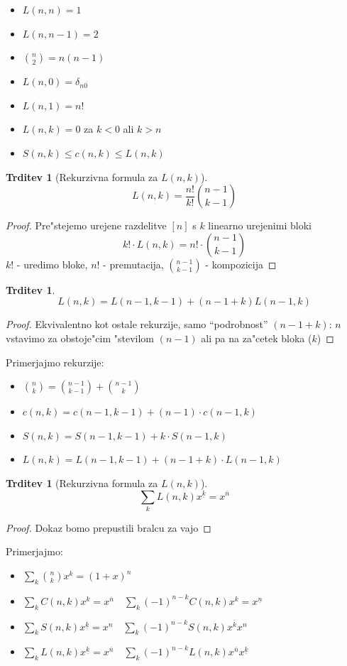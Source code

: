 \documentclass[a4paper,12pt]{article}
\theoremstyle{definition}
\newtheorem{claim}[counter]{Trditev}
\theoremstyle{remark}
\begin{document}
\begin{itemize}
	\item $L(n,n) = 1$
	\item $L(n,n-1) = 2$
	\item $\binom{n}{2} = n(n-1)$
	\item $L(n,0) = \delta_{n0}$
	\item $L(n,1) = n!$
	\item $L(n,k) = 0$ za $k < 0$ ali $k > n$
	\item $S(n,k) \leq c(n,k) \leq L(n,k)$
\end{itemize}

\begin{claim}[Rekurzivna formula za $L(n, k)$]
    \[L(n,k) = \frac{n!}{k!} \binom{n-1}{k-1}\]
\end{claim}
\begin{proof}
    Pre"stejemo urejene razdelitve $[n]$ s $k$ linearno urejenimi bloki
    \[ k! \cdot L(n,k) = n! \cdot \binom{n-1}{k-1} \]
    $k!$ - uredimo bloke, $n!$ - premutacija, $\binom{n-1}{k-1}$ - kompozicija
\end{proof}

\begin{claim}
    \[L(n,k) = L(n-1, k-1) + (n-1+k) L(n-1, k)\]
\end{claim}
\begin{proof}
    Ekvivalentno kot ostale rekurzije, samo ``podrobnost'' $(n-1+k)$: $n$ vstavimo za obstoje"cim "stevilom $(n-1)$ ali pa na za"cetek bloka ($k$)
\end{proof}

Primerjajmo rekurzije:
\begin{itemize}
    \item $\binom{n}{k} = \binom{n-1}{k-1} + \binom{n-1}{k}$
    \item $c(n,k) = c(n-1, k-1) + (n-1) \cdot c(n-1, k)$
    \item $S(n,k) = S(n-1, k-1) + k\cdot S(n-1, k)$
    \item $L(n,k) = L(n-1, k-1) + (n-1+k)\cdot L(n-1, k)$
\end{itemize}

\begin{claim}[Rekurzivna formula za $L(n, k)$]
    \[ \sum_k L(n,k)x^{\underline{k}} = x^{\overline{n}}\]
\end{claim}
\begin{proof}
    Dokaz bomo prepustili bralcu za vajo
\end{proof}

Primerjajmo:
\begin{itemize}
    \item $\sum_k \binom{n}{k}x^k = (1+x)^n$
    \item $\sum_k C(n,k)x^k = x^{\overline{n}} \quad \sum_k (-1)^{n-k}C(n,k)x^k = x^{\underline{n}}$
    \item $\sum_k S(n,k)x^{\underline{k}} = x^n \quad \sum_k (-1)^{n-k}S(n,k)x^{\overline{k}}x^n$
    \item $\sum_k L(n,k)x^{\underline{k}} = x^{\overline{{n}}} \quad \sum_k (-1)^{n-k}L(n,k)x^{\overline{{n}}}x^{\underline{k}}$
\end{itemize}
\end{document}
